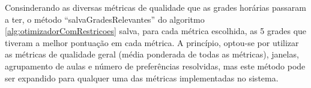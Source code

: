 Consinderando as diversas métricas de qualidade que as grades horárias passaram a ter, o método ``salvaGradesRelevantes'' do algoritmo \ref{alg:otimizadorComRestricoes} salva, para cada métrica escolhida, as 5 grades que tiveram a melhor pontuação em cada métrica. A princípio, optou-se por utilizar as métricas de qualidade geral (média ponderada de todas as métricas), janelas, agrupamento de aulas e número de preferências resolvidas, mas este método pode ser expandido para qualquer uma das métricas implementadas no sistema.

